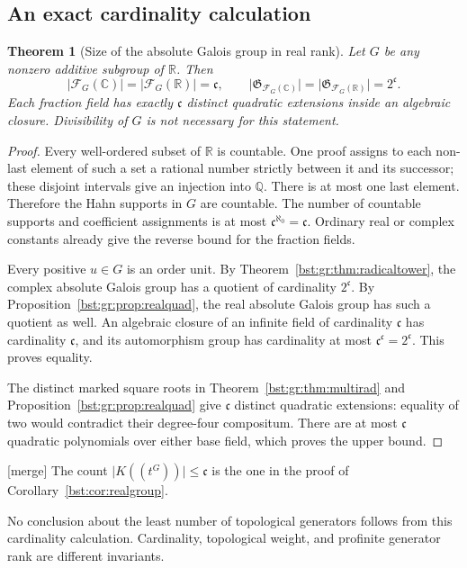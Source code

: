 \documentclass[11pt,letterpaper]{article}
\newtheorem{theorem}{Theorem}[section]
\theoremstyle{definition}
\theoremstyle{remark}
\newcommand{\Q}{\mathbb Q}
\newcommand{\R}{\mathbb R}
\newcommand{\C}{\mathbb C}
\newcommand{\HH}[2]{#1((t^{#2}))}
\newcommand{\FF}[2]{\mathcal F_{#2}(#1)}
\newcommand{\cc}{\mathfrak c}
\newcommand{\abs}[1]{\lvert #1\rvert}
\newcommand{\AbsGal}[1]{\mathfrak G_{#1}}
\begin{document}
\subsection{An exact cardinality calculation}

\begin{theorem}[Size of the absolute Galois group in real rank]\label{bst:gr:thm:cardinality}
Let $G$ be any nonzero additive subgroup of $\R$. Then
\[
 \abs{\FF{\C}G}=\abs{\FF{\R}G}=\cc,
 \qquad
 \abs{\AbsGal{\FF{\C}G}}=\abs{\AbsGal{\FF{\R}G}}=2^{\cc}.
\]
Each fraction field has exactly $\cc$ distinct quadratic extensions inside
an algebraic closure. Divisibility of $G$ is not necessary for this
statement.
\end{theorem}
\begin{proof}
Every well-ordered subset of $\R$ is countable. One proof assigns to each
non-last element of such a set a rational number strictly between it and its
successor; these disjoint intervals give an injection into $\Q$. There is at
most one last element. Therefore the Hahn supports in $G$ are countable. The
number of countable supports and coefficient assignments is at most
$\cc^{\aleph_0}=\cc$. Ordinary real or complex constants already give the
reverse bound for the fraction fields.

Every positive $u\in G$ is an order unit. By
Theorem~\ref{bst:gr:thm:radicaltower}, the complex absolute Galois group has a
quotient of cardinality $2^{\cc}$. By Proposition~\ref{bst:gr:prop:realquad},
the real absolute Galois group has such a quotient as well. An algebraic
closure of an infinite field of cardinality $\cc$ has cardinality $\cc$, and
its automorphism group has cardinality at most $\cc^{\cc}=2^{\cc}$. This
proves equality.

The distinct marked square roots in Theorem~\ref{bst:gr:thm:multirad} and
Proposition~\ref{bst:gr:prop:realquad} give $\cc$ distinct quadratic
extensions: equality of two would contradict their degree-four compositum.
There are at most $\cc$ quadratic polynomials over either base field, which
proves the upper bound.
\end{proof}

\textup{[merge]} The count $\abs{\HH KG}\le\cc$ is the one in the proof of
Corollary~\ref{bst:cor:realgroup}.

No conclusion about the least number of topological generators follows from
this cardinality calculation. Cardinality, topological weight, and profinite
generator rank are different invariants.
\end{document}
